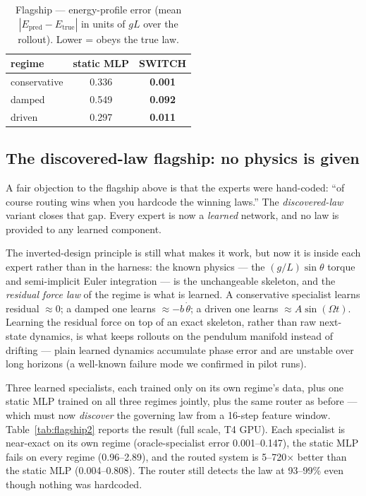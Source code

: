 \documentclass[11pt,a4paper]{article}
\begin{document}
\begin{table}[t]
  \centering
  \caption{Flagship --- energy-profile error (mean $|E_{\text{pred}}-E_{\text{true}}|$
in units of $gL$ over the rollout). Lower = obeys the true law.}
  \label{tab:flagshipE}
  \begin{tabular}{lcc}
    \toprule
    regime & static MLP & SWITCH \\
    \midrule
    conservative & 0.336 & \textbf{0.001} \\
    damped       & 0.549 & \textbf{0.092} \\
    driven       & 0.297 & \textbf{0.011} \\
    \bottomrule
  \end{tabular}
\end{table}

\subsection{The discovered-law flagship: no physics is given}
\label{sec:flagship2}

A fair objection to the flagship above is that the experts were hand-coded:
``of course routing wins when you hardcode the winning laws.'' The
\emph{discovered-law} variant closes that gap. Every expert is now a
\emph{learned} network, and no law is provided to any learned component.

The inverted-design principle is still what makes it work, but now it is
inside each expert rather than in the harness: the known physics --- the
$(g/L)\sin\theta$ torque and semi-implicit Euler integration --- is the
unchangeable skeleton, and the \emph{residual force law} of the regime is
what is learned. A conservative specialist learns residual $\approx 0$; a
damped one learns $\approx -b\,\dot\theta$; a driven one learns
$\approx A\sin(\Omega t)$. Learning the residual force on top of an exact
skeleton, rather than raw next-state dynamics, is what keeps rollouts on the
pendulum manifold instead of drifting --- plain learned dynamics accumulate
phase error and are unstable over long horizons (a well-known failure mode we
confirmed in pilot runs).

Three learned specialists, each trained only on its own regime's data, plus
one static MLP trained on all three regimes jointly, plus the same router as
before --- which must now \emph{discover} the governing law from a 16-step
feature window. Table~\ref{tab:flagship2} reports the result (full scale, T4
GPU). Each specialist is near-exact on its own regime (oracle-specialist
error 0.001--0.147), the static MLP fails on every regime (0.96--2.89), and
the routed system is 5--720$\times$ better than the static MLP (0.004--0.808).
The router still detects the law at 93--99\% even though nothing was
hardcoded.
\end{document}
